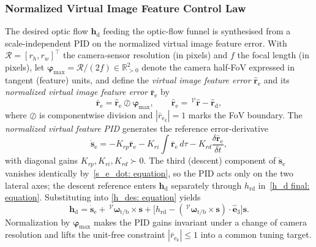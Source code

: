 \subsubsection{Normalized Virtual Image Feature Control Law} \label{normalized pid: section}
The desired optic flow $\boldsymbol{h}_\text{d}$ feeding the optic-flow funnel is synthesised from a scale-independent PID on the normalized virtual image feature error. With $\mathcal{R}=[r_h,r_w]^\top$ the camera-sensor resolution (in pixels) and $f$ the focal length (in pixels), let $\boldsymbol{\varphi}_\text{max}=\mathcal{R}/(2f)\in\mathbb{R}^2_{>0}$ denote the camera half-FoV expressed in tangent (feature) units, and define the \emph{virtual image feature error} $\hat{\boldsymbol{r}}_\text{e}$ and its \emph{normalized virtual image feature error} $\bar{\boldsymbol{r}}_\text{e}$ by
\begin{equation} \label{normalized error: equation}
    \bar{\boldsymbol{r}}_\text{e} = \hat{\boldsymbol{r}}_\text{e}\oslash\boldsymbol{\varphi}_\text{max},\qquad\hat{\boldsymbol{r}}_\text{e}=\,^\mathcal{V}\hat{\boldsymbol{r}}-\hat{\boldsymbol{r}}_\text{d},
\end{equation}
where $\oslash$ is componentwise division and $|\bar{r}_{\text{e}_k}|=1$ marks the FoV boundary. The \emph{normalized virtual feature PID} generates the reference error-derivative
\begin{equation} \label{s_e_dot_d: equation}
    \dot{\boldsymbol{s}}_\text{e} = -K_{rp}\bar{\boldsymbol{r}}_\text{e} - K_{ri}\!\int\bar{\boldsymbol{r}}_\text{e}\,d\tau - K_{rd}\frac{\delta\bar{\boldsymbol{r}}_\text{e}}{\delta t},
\end{equation}
with diagonal gains $K_{rp},K_{ri},K_{rd}\succ 0$. The third (descent) component of $\dot{\boldsymbol{s}}_\text{e}$ vanishes identically by~\eqref{s_e_dot: equation}, so the PID acts only on the two lateral axes; the descent reference enters $\boldsymbol{h}_\text{d}$ separately through $h_\text{rd}$ in~\eqref{h_d final: equation}. Substituting into \eqref{h_des: equation} yields
\begin{equation} \label{h_d final: equation}
    \boldsymbol{h}_\text{d} = \dot{\boldsymbol{s}}_\text{e} + \,^\mathcal{V}\boldsymbol{\omega}_\text{t/b}\times\boldsymbol{s} + \big[h_\text{rd} - (\,^\mathcal{V}\boldsymbol{\omega}_\text{t/b}\times\boldsymbol{s})\cdot\hat{\boldsymbol{e}}_3\big]\boldsymbol{s}.
\end{equation}
Normalization by $\boldsymbol{\varphi}_\text{max}$ makes the PID gains invariant under a change of camera resolution and lifts the unit-free constraint $|\bar{r}_{\text{e}_k}|\le 1$ into a common tuning target.


